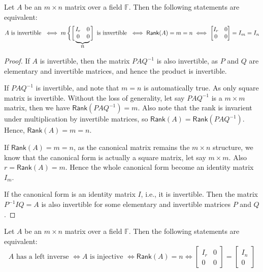 \documentclass[
	11pt, %
	fleqn, %
	a4paper, %
]{LegrandOrangeBook}
\newcommand{\F}{\mathbb{F}} %
\newcommand{\rank}[1]{\mathsf{Rank}(#1)} %
\begin{document}
\begin{proposition}
    Let $A$ be an $m \times n$ matrix over a field $\F$. Then the following statements are equivalent:
    \[
        A \text{ is invertible } \iff m \left\{\left[\vphantom{\matriximg}\right.\right.\kern-2\nulldelimiterspace
        \underbrace{\matriximg}_{\text{\normalsize $n$}}\kern-\nulldelimiterspace\left.\vphantom{\matriximg}\right] \text{ is invertible } \iff \rank{A} = m = n \iff \begin{bmatrix}
            I_r & 0 \\
            0 & 0
        \end{bmatrix} = I_m = I_n
    \]
\end{proposition}

\begin{proof}
    If $A$ is invertible, then the matrix $PAQ^{-1}$ is also invertible, as $P$ and $Q$ are elementary and invertible matrices, and hence the product is invertible. 
    
    If $PAQ^{-1}$ is invertible, and note that $m = n$ is automatically true. As only square matrix is invertible. Without the loss of generality, let say $PAQ^{-1}$ is a $m \times m$ matrix, then we have $\rank{PAQ^{-1}} = m$. Also note that the rank is invarient under multiplication by invertible matrices, so $\rank{A} = \rank{PAQ^{-1}}$. Hence, $\rank{A} = m = n$.

    If $\rank{A} = m = n$, as the canonical matrix remains the $m \times n$ structure, we know that the canonical form is actually a square matrix, let say $m \times m$. Also $r = \rank{A} = m$. Hence the whole canonical form become an identity matrix $I_m$.

    If the canonical form is an identity matrix $I$, i.e., it is invertible. Then the matrix $P^{-1}IQ = A$ is also invertible for some elementary and invertible matrices $P$ and $Q$.
\end{proof}

\begin{proposition}
    Let $A$ be an $m \times n$ matrix over a field $\F$. Then the following statements are equivalent:
    \[
        A \text{ has a left inverse } \iff A \text{ is injective } \iff \rank{A} = n \iff \begin{bmatrix}
            I_r & 0 \\
            0 & 0
        \end{bmatrix} = \begin{bmatrix}
            I_n \\
            0
        \end{bmatrix}
    \]
\end{proposition}
\end{document}
